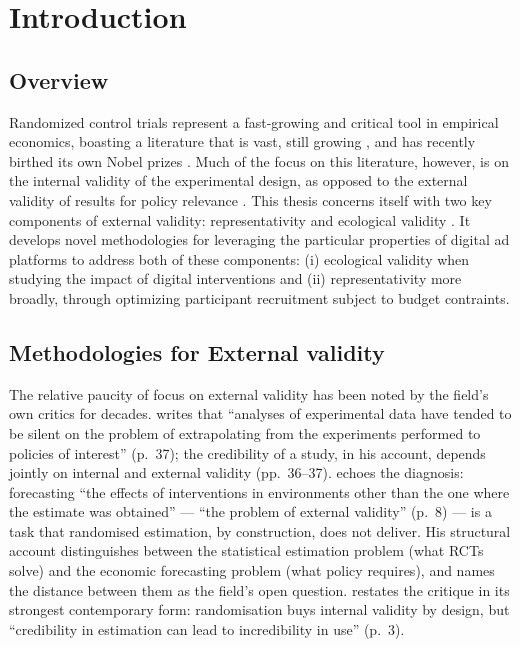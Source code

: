 \chapter{Introduction}
\label{ch:introduction}



\section{Overview}
\label{sec:intro:overview}


Randomized control trials represent a fast-growing and critical tool in empirical economics, boasting a literature that is vast, still growing \citep{Imbens2023}, and has recently birthed its own 
Nobel prizes \citep{Banerjee2020,Duflo2020,Kremer2020}. Much of the focus on this literature, however, is on the internal validity of the experimental design, as opposed to the external validity of results for policy relevance \citep{Heckman2008,Deaton2018,Manski2013}. This thesis concerns itself with two key components of external validity: representativity and ecological validity \citep{Neyman1934,Schmuckler2001}. It develops novel methodologies for leveraging the particular properties of digital ad platforms to address both of these components: (i) ecological validity when studying the impact of digital interventions and (ii) representativity more broadly, through optimizing participant recruitment subject to budget contraints. 

\section{Methodologies for External validity}
\label{sec:intro:ev}


The relative paucity of focus on external validity has been noted by the field's own critics for decades. \citet{Manski2013} writes that ``analyses of experimental data have tended to be silent on the problem of extrapolating from the experiments performed to policies of interest'' (p.~37); the credibility of a study, in his account, depends jointly on internal and external validity (pp.~36--37). \citet{Heckman2008} echoes the diagnosis: forecasting ``the effects of interventions in environments other than the one where the estimate was obtained'' --- ``the problem of external validity'' (p.~8) --- is a task that randomised estimation, by construction, does not deliver. His structural account distinguishes between the statistical estimation problem (what RCTs solve) and the economic forecasting problem (what policy requires), and names the distance between them as the field's open question. \citet{Deaton2018} restates the critique in its strongest contemporary form: randomisation buys internal validity by design, but ``credibility in estimation can lead to incredibility in use'' (p.~3).


